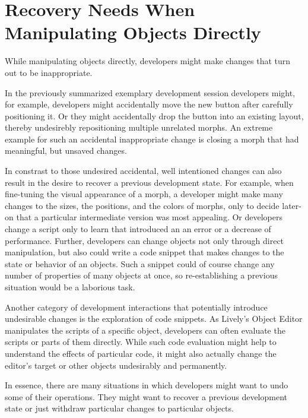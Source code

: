 


\section{Recovery Needs When Manipulating Objects Directly}

While manipulating objects directly, developers might make changes that turn out to be inappropriate.

In the previously summarized exemplary development session developers might, for example, developers might accidentally move the new button after carefully positioning it.
Or they might accidentally drop the button into an existing layout, thereby undesirebly repositioning multiple unrelated morphs.
An extreme example for such an accidental inappropriate change is closing a morph that had meaningful, but unsaved changes.

In constrast to those undesired accidental, well intentioned changes can also result in the desire to recover a previous development state.
For example, when fine-tuning the visual appearance of a morph, a developer might make many changes to the sizes, the positions, and the colors of morphs, only to decide later-on that a particular intermediate version was most appealing.
Or developers change a script only to learn that introduced an an error or a decrease of performance.
Further, developers can change objects not only through direct manipulation, but also could write a code snippet that makes changes to the state or behavior of an objects.
Such a snippet could of course change any number of properties of many objects at once, so re-establishing a previous situation would be a laborious task.

Another category of development interactions that potentially introduce undesirable changes is the exploration of code snippets.
As Lively's Object Editor manipulates the scripts of a specific object, developers can often evaluate the scripts or parts of them directly.
While such code evaluation might help to understand the effects of particular code, it might also actually change the editor's target or other objects undesirably and permanently.

In essence, there are many situations in which developers might want to undo some of their operations.
They might want to recover a previous development state or just withdraw particular changes to particular objects.

